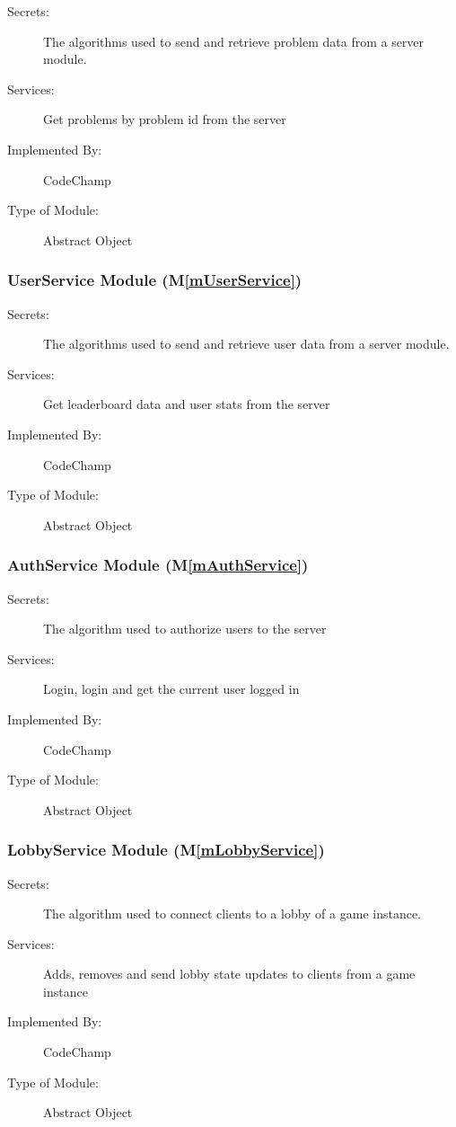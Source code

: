 \documentclass[12pt, titlepage]{article}
\newcommand{\mref}[1]{M\ref{#1}}
\begin{document}
\begin{description}
\item[Secrets:] The algorithms used to send and retrieve problem data from a server module.
\item[Services:] Get problems by problem id from the server
\item[Implemented By:] CodeChamp
\item[Type of Module:] Abstract Object
\end{description}

\subsubsection{ UserService Module (\mref{mUserService})}

\begin{description}
\item[Secrets:] The algorithms used to send and retrieve user data from a server module.
\item[Services:] Get leaderboard data and user stats from the server
\item[Implemented By:] CodeChamp
\item[Type of Module:] Abstract Object
\end{description}

\subsubsection{ AuthService Module (\mref{mAuthService})}

\begin{description}
\item[Secrets:] The algorithm used to authorize users to the server
\item[Services:] Login, login and get the current user logged in
\item[Implemented By:] CodeChamp
\item[Type of Module:] Abstract Object
\end{description}

\subsubsection{ LobbyService Module (\mref{mLobbyService})}

\begin{description}
\item[Secrets:] The algorithm used to connect clients to a lobby of a game instance.
\item[Services:] Adds, removes and send lobby state updates to clients from a game instance
\item[Implemented By:] CodeChamp
\item[Type of Module:] Abstract Object
\end{description}
\end{document}
